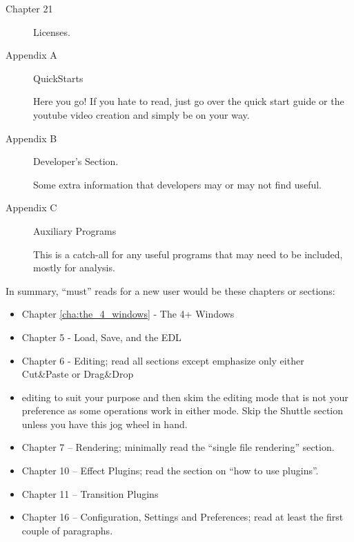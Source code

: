\begin{description}
    \item[Chapter 21] Licenses.

    \item[Appendix A] QuickStarts

        Here you go! If you hate to read, just go over the quick start guide or the youtube video creation and simply be on your way.

    \item[Appendix B] Developer’s Section.

        Some extra information that developers may or may not find useful.

    \item[Appendix C] Auxiliary Programs

        This is a catch-all for any useful programs that may need to be included, mostly for analysis.

\end{description}

In summary, “must” reads for a new user would be these chapters or sections:

\begin{itemize}
    \item Chapter \ref{cha:the_4_windows} - The 4+ Windows
    \item Chapter 5 - Load, Save, and the EDL
    \item Chapter 6 - Editing; read all sections except emphasize only either Cut\&Paste or Drag\&Drop

    \item editing to suit your purpose and then skim the editing mode that is not your preference as some operations work in either mode. Skip the Shuttle section unless you have this jog wheel in hand.
    \item Chapter 7 – Rendering; minimally read the “single file rendering” section.
    \item Chapter 10 – Effect Plugins; read the section on “how to use plugins”.
    \item Chapter 11 – Transition Plugins
    \item Chapter 16 – Configuration, Settings and Preferences; read at least the first couple of paragraphs.
\end{itemize}


